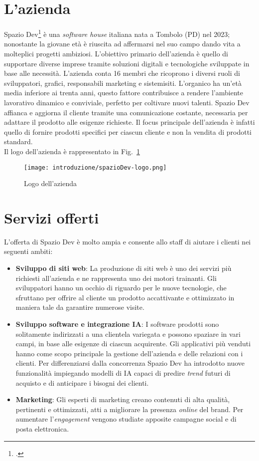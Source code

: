 \section{L'azienda}
Spazio Dev\footcite{site:spaziodev} è una \emph{software house} italiana nata a Tombolo (PD) nel 2023; nonostante la giovane età è riuscita ad affermarsi nel suo campo dando vita a molteplici progetti ambiziosi. L'obiettivo primario dell'azienda è quello di supportare diverse imprese tramite soluzioni digitali e tecnologiche sviluppate in base alle necessità.
L'azienda conta 16 membri che ricoprono i diversi ruoli di sviluppatori, grafici, responsabili marketing e sistemisiti. L'organico ha un'età media inferiore ai trenta anni, questo fattore contribuisce a rendere l'ambiente lavorativo dinamico e conviviale, perfetto per coltivare nuovi talenti.
Spazio Dev affianca e aggiorna il cliente tramite una comunicazione costante, necessaria per adattare il prodotto alle esigenze richieste. Il focus principale dell'azienda è infatti quello di fornire prodotti specifici per ciascun cliente e non la vendita di prodotti standard.\\
Il logo dell'azienda è rappresentato in Fig.~\ref{fig:logo-spaziodev}

\begin{figure}[!h] 
  \centering 
  \texttt{[image: introduzione/spazioDev-logo.png]} 
  \caption{Logo dell'azienda}
  \label{fig:logo-spaziodev}
\end{figure}



\section{Servizi offerti}
L'offerta di Spazio Dev è molto ampia e consente allo staff di aiutare i clienti nei seguenti ambiti:
\begin{itemize}
  \item \textbf{Sviluppo di siti web}: La produzione di siti web è uno dei servizi più richiesti all'azienda e ne rappresenta uno dei motori trainanti. Gli sviluppatori hanno un occhio di riguardo per le nuove tecnologie, che sfruttano per offrire al cliente un prodotto accattivante e ottimizzato in maniera tale da garantire numerose visite.
  \item \textbf{Sviluppo software e integrazione IA}: I software prodotti sono solitamente indirizzati a una clientela variegata e possono spaziare in vari campi, in base alle esigenze di ciascun acquirente. Gli applicativi più venduti hanno come scopo principale la gestione dell'azienda e delle relazioni con i clienti. Per differenziarsi dalla concorrenza Spazio Dev ha introdotto nuove funzionalità impiegando modelli di IA capaci di predire \emph{trend} futuri di acquisto e  di anticipare i bisogni dei clienti.
  \item \textbf{Marketing}: Gli esperti di marketing creano contenuti di alta qualità, pertinenti e ottimizzati, atti a migliorare la presenza \emph{online} del brand. Per aumentare l'\emph{engagement} vengono studiate apposite campagne social e di posta elettronica.
\end{itemize}


